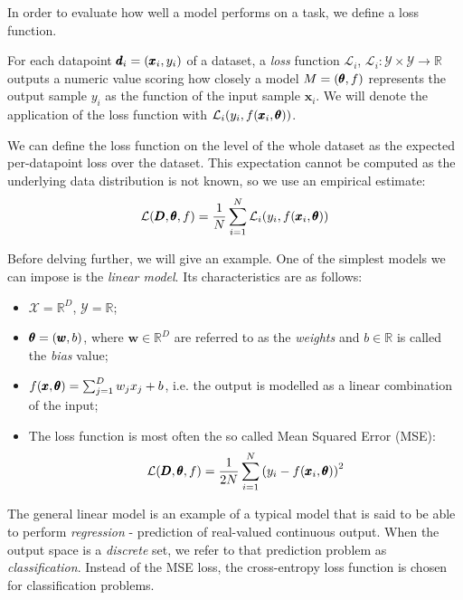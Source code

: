 In order to evaluate how well a model performs on a task, we define a loss function.

\begin{definition}
For each datapoint $\pmb{d}_i=\mathopen{}\left(\pmb{x}_i, y_i\right)$ of a dataset, a \emph{loss} function $\mathcal{L}_{i}$, $\mathcal{L}_{i}: \mathcal{Y} \times \mathcal{Y} \to \mathbb{R} $ outputs a numeric value scoring how closely a model $M = \mathopen{}\left(\pmb{\theta}, f\right)$ represents the output sample $y_i$ as the function of the input sample $\pmb{x}_i$. We will denote the application of the loss function with $\mathcal{L}_{i}\mathopen{}\left(y_i, f\mathopen{}\left(\pmb{x}_i, \pmb{\theta}\right)\right)$.

We can define the loss function on the level of the whole dataset as the expected per-datapoint loss over the dataset. This expectation cannot be computed as the underlying data distribution is not known, so we use an empirical estimate: \begin{equation}
\mathcal{L}\mathopen{}\left(\pmb{D}, \pmb{\theta}, f\right) = \frac{1}{N}\sum_{i=1}^{N}{\mathcal{L}_{i}\mathopen{}\left(y_i, f\mathopen{}\left(\pmb{x}_i, \pmb{\theta}\right)\right)}
\end{equation}
\end{definition}

Before delving further, we will give an example. One of the simplest models we can impose is the \emph{linear model}. Its characteristics are as follows:
\begin{itemize}
\item $\mathcal{X} = \mathbb{R}^D$, $\mathcal{Y}=\mathbb{R}$;
\item $\pmb{\theta} = \mathopen{}\left(\pmb{w}, b\right)$, where $\pmb{w} \in \mathbb{R}^D$ are referred to as the \emph{weights} and $b \in \mathbb{R}$ is called the \emph{bias} value;
\item $f\mathopen{}\left(\pmb{x}, \pmb{\theta}\right) = \sum_{j=1}^{D}{w_j x_j} + b$, i.e. the output is modelled as a linear combination of the input;
\item The loss function is most often the so called Mean Squared Error (MSE): \begin{equation}
\mathcal{L}\mathopen{}\left(\pmb{D}, \pmb{\theta}, f\right) = \frac{1}{2N}\sum_{i=1}^{N}{\mathopen{}\left(y_i - f\mathopen{}\left(\pmb{x}_i, \pmb{\theta}\right)\right)^2}
\end{equation}
\end{itemize}

The general linear model is an example of a typical model that is said to be able to perform \emph{regression} - prediction of real-valued continuous output. When the output space is a \emph{discrete} set, we refer to that prediction problem as \emph{classification}. Instead of the MSE loss, the cross-entropy loss function is chosen for classification problems.

